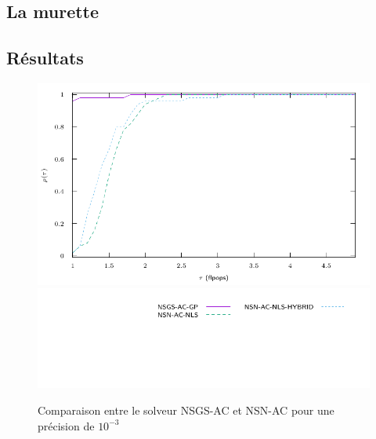 \documentclass{CSMA2017}
\begin{document}
\subsection{La murette}
\subsection{Résultats}
\begin{figure}
  \centering
  \includegraphics{figure/LowWall_FEM.1e-3.with_guess/simple/profile-LMGC_LowWall_FEM.pdf}
  \includegraphics{figure/LowWall_FEM.1e-3.with_guess/simple/profile-LMGC_LowWall_FEM_legend.pdf}
  \caption{Comparaison entre le solveur NSGS-AC et NSN-AC pour une précision de $10^{-3}$}
  \label{fig:LowWall_FEM.1e-3.simple}
\end{figure}
\end{document}
